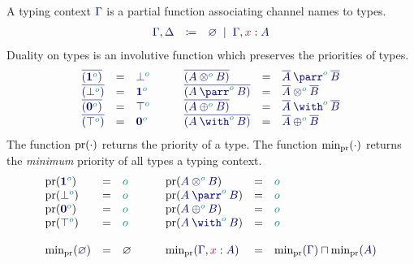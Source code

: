 \documentclass[main.tex]{subfiles}
\begin{document}
A typing context $\ty\Gamma$ is a partial function associating channel names to types.
\[
\begin{array}{lcl}
  \ty{\Gamma}, \ty{\Delta}
  & \coloneqq & \ty{\emptyenv}
    \sep        \ty{\Gamma}, \tmty{x}{A}
\end{array}
\]
Duality on types is an involutive function which preserves the priorities of types.
\[
\begin{array}{lcl}
  \ty{\co{(\tyone[\cs{o}])}} & = & \ty{\tybot[\cs{o}]} \\
  \ty{\co{(\tybot[\cs{o}])}} & = & \ty{\tyone[\cs{o}]} \\
  \ty{\co{(\tynil[\cs{o}])}} & = & \ty{\tytop[\cs{o}]} \\
  \ty{\co{(\tytop[\cs{o}])}} & = & \ty{\tynil[\cs{o}]}
\end{array}
\qquad
\begin{array}{lcl}
  \ty{\co{(\tytens[\cs{o}]{A}{B})}} & = & \ty{\typarr[\cs{o}]{\co{A}}{\co{B}}} \\
  \ty{\co{(\typarr[\cs{o}]{A}{B})}} & = & \ty{\tytens[\cs{o}]{\co{A}}{\co{B}}} \\
  \ty{\co{(\typlus[\cs{o}]{A}{B})}} & = & \ty{\tywith[\cs{o}]{\co{A}}{\co{B}}} \\
  \ty{\co{(\tywith[\cs{o}]{A}{B})}} & = & \ty{\typlus[\cs{o}]{\co{A}}{\co{B}}}
\end{array}
\]
The function $\operatorname{pr}(\cdot)$ returns the priority of a type. The function $\text{min}_{\operatorname{pr}}(\cdot)$ returns the \emph{minimum} priority of all types a typing context.
\[
\begin{array}{lclclcl}
  \pr(\ty{\tyone[\cs{o}]})        & = & \cs{o}  \\
  \pr(\ty{\tybot[\cs{o}]})        & = & \cs{o}  \\
  \pr(\ty{\tynil[\cs{o}]})        & = & \cs{o}  \\
  \pr(\ty{\tytop[\cs{o}]})        & = & \cs{o}  \\
  \\
  \minpr(\ty{\emptyenv})          & = & \varnothing
\end{array}
\qquad
\begin{array}{lclclcl}
  \pr(\ty{\tytens[\cs{o}]{A}{B}}) & = & \cs{o}  \\
  \pr(\ty{\typarr[\cs{o}]{A}{B}}) & = & \cs{o}  \\
  \pr(\ty{\typlus[\cs{o}]{A}{B}}) & = & \cs{o}  \\
  \pr(\ty{\tywith[\cs{o}]{A}{B}}) & = & \cs{o}  \\
  \\
  \minpr(\ty{\Gamma},\tmty{x}{A}) & = & \minpr(\ty{\Gamma})\sqcap\minpr(\ty{A})
\end{array}
\]
\end{document}
